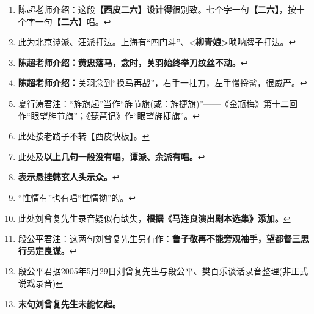 \begin{enumerate}
\item
  \leavevmode\hypertarget{fn176}{}%
  陈超老师介绍：这段\textbf{【西皮二六】设计得}很别致。七个字一句\textbf{【二六】}，按十个字一句\textbf{【二六】}唱。\protect\hyperlink{fnref176}{↩}
\item
  \leavevmode\hypertarget{fn177}{}%
  此为北京谭派、汪派打法。上海有``四门斗''、\textless{}\textbf{柳青娘\textgreater{}}唢呐牌子打法。\protect\hyperlink{fnref177}{↩}
\item
  \leavevmode\hypertarget{fn178}{}%
  \textbf{陈超老师介绍：黄忠落马，念时，关羽始终举刀纹丝不动。}\protect\hyperlink{fnref178}{↩}
\item
  \leavevmode\hypertarget{fn179}{}%
  \textbf{陈超老师介绍：}关羽念到``换马再战''，右手一拄刀，左手慢捋髯，很威严。\protect\hyperlink{fnref179}{↩}
\item
  \leavevmode\hypertarget{fn180}{}%
  夏行涛君注：``旌旗起''当作``旌节旗(或：旌捷旗)''------《金瓶梅》第十二回作``眼望旌节旗''；《琵琶记》作``眼望旌捷旗''。\protect\hyperlink{fnref180}{↩}
\item
  \leavevmode\hypertarget{fn181}{}%
  此处按老路子不转【西皮快板】。\protect\hyperlink{fnref181}{↩}
\item
  \leavevmode\hypertarget{fn182}{}%
  此处及\textbf{以上几句一般没有唱，谭派、余派有唱。}\protect\hyperlink{fnref182}{↩}
\item
  \leavevmode\hypertarget{fn183}{}%
  \textbf{表示悬挂韩玄人头示众。}\protect\hyperlink{fnref183}{↩}
\item
  \leavevmode\hypertarget{fn184}{}%
  ``性情有''也有唱``性情拗''的。\protect\hyperlink{fnref184}{↩}
\item
  \leavevmode\hypertarget{fn185}{}%
  此处刘曾复先生录音疑似有缺失，\textbf{根据《马连良演出剧本选集》添加。}\protect\hyperlink{fnref185}{↩}
\item
  \leavevmode\hypertarget{fn186}{}%
  段公平君注：这两句刘曾复先生另有作：\textbf{鲁子敬再不能旁观袖手，望都督三思行另定良谋。}\protect\hyperlink{fnref186}{↩}
\item
  \leavevmode\hypertarget{fn187}{}%
  段公平君据2005年5月29日刘曾复先生与段公平、樊百乐谈话录音整理(非正式说戏录音)\protect\hyperlink{fnref187}{↩}
\item
  \leavevmode\hypertarget{fn188}{}%
  \textbf{末句刘曾复先生未能忆起。}


\end{enumerate}
